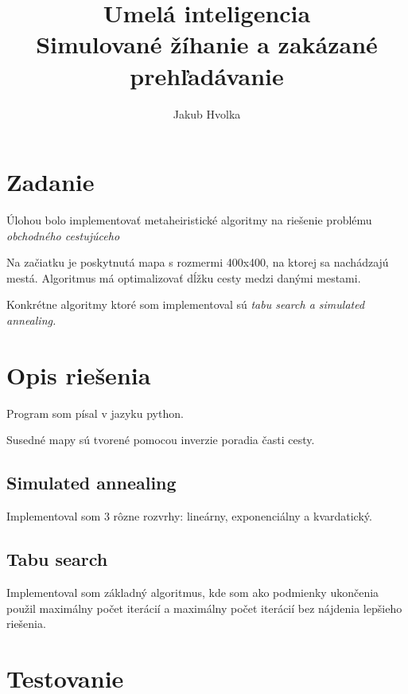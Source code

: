 \begingroup
\frontmatter

\title{Umelá inteligencia \\ Simulované žíhanie a zakázané prehľadávanie}
\author{Jakub Hvolka}
\maketitle
\newpage

\tableofcontents

\newpage

\mainmatter


\section{Zadanie}\label{sec:zadanie}

Úlohou bolo implementovať metaheiristické algoritmy na riešenie problému \em{obchodného cestujúceho}

Na začiatku je poskytnutá mapa s rozmermi 400x400, na ktorej sa nachádzajú mestá.
Algoritmus má optimalizovať dĺžku cesty medzi danými mestami.

Konkrétne algoritmy ktoré som implementoval sú \em{tabu search} a \em{simulated annealing}.


\section{Opis riešenia}\label{sec:opis-riešenia}

Program som písal v jazyku python.

Susedné mapy sú tvorené pomocou inverzie poradia časti cesty.

\subsection{Simulated annealing}\label{subsec:simulated-annealing}

Implementoval som 3 rôzne rozvrhy: lineárny, exponenciálny a kvardatický.

\subsection{Tabu search}\label{subsec:algoritmus}

Implementoval som základný algoritmus, kde som ako podmienky ukončenia použil maximálny počet iterácií a
maximálny počet iterácií bez nájdenia lepšieho riešenia.


\section{Testovanie}\label{sec:testovanie}


